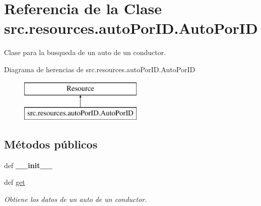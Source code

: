 \hypertarget{classsrc_1_1resources_1_1auto_por_i_d_1_1_auto_por_i_d}{\section{Referencia de la Clase src.\-resources.\-auto\-Por\-I\-D.\-Auto\-Por\-I\-D}
\label{classsrc_1_1resources_1_1auto_por_i_d_1_1_auto_por_i_d}
}


Clase para la busqueda de un auto de un conductor.  


Diagrama de herencias de src.\-resources.\-auto\-Por\-I\-D.\-Auto\-Por\-I\-D\begin{figure}[H]
\begin{center}
\leavevmode
\includegraphics[height=2.000000cm]{classsrc_1_1resources_1_1auto_por_i_d_1_1_auto_por_i_d}
\end{center}
\end{figure}
\subsection*{Métodos públicos}
\begin{DoxyCompactItemize}
\item 
\hypertarget{classsrc_1_1resources_1_1auto_por_i_d_1_1_auto_por_i_d_a2446724f31d69e60ffb2b866609499f6}{def {\bfseries \-\_\-\-\_\-init\-\_\-\-\_\-}}\label{classsrc_1_1resources_1_1auto_por_i_d_1_1_auto_por_i_d_a2446724f31d69e60ffb2b866609499f6}

\item 
def \hyperlink{classsrc_1_1resources_1_1auto_por_i_d_1_1_auto_por_i_d_a29f36e323532a28e015bbe60b353837d}{get}
\begin{DoxyCompactList}\small\item\em Obtiene los datos de un auto de un conductor. \end{DoxyCompactList}\end{DoxyCompactItemize}
